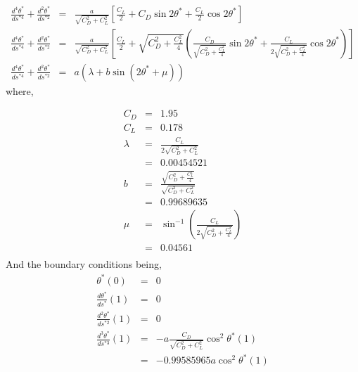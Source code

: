 \documentclass[a3paper,12pt]{report}
\begin{document}
\begin{eqnarray}
		\frac{d^4\theta^*}{ds^{*4}}+\frac{d^2\theta^*}{ds^{*2}} &=& \frac{a}{\sqrt{C_D^2+C_L^2}}\left[\frac{C_L}{2}+ C_D\sin2\theta^*+ \frac{C_L}{2}\cos2\theta^*\right]\\
		\frac{d^4\theta^*}{ds^{*4}}+\frac{d^2\theta^*}{ds^{*2}} &=& \frac{a}{\sqrt{C_D^2+C_L^2}}\left[\frac{C_L}{2}+ \sqrt{C_D^2 + \frac{C_L^2}{4}}\left(\frac{C_D}{\sqrt{C_D^2 + \frac{C_L^2}{4}}}\sin2\theta^*+ \frac{C_L}{2\sqrt{C_D^2 + \frac{C_L^2}{4}}}\cos2\theta^*\right)\right]\\
		\frac{d^4\theta^*}{ds^{*4}}+\frac{d^2\theta^*}{ds^{*2}} &=& a\left(\lambda+ b\sin(2\theta^* + \mu)\right)
	\end{eqnarray}
where,\\
\raggedright
\begin{eqnarray*}
C_D &=& 1.95\\
C_L &=& 0.178\\
\lambda &=& \frac{C_L}{2\sqrt{C_D^2+C_L^2}}\\
 &=& 0.00454521\\
b &=& \frac{\sqrt{C_D^2 + \frac{C_L^2}{4}}}{\sqrt{C_D^2+C_L^2}}\\
 &=& 0.99689635\\
\mu &=& \sin^{-1}\left(\frac{C_L}{2\sqrt{C_D^2 + \frac{C_L^2}{4}}}\right)\\
 &=& 0.04561\\
\end{eqnarray*}
And the boundary conditions being,
\begin{eqnarray}
\theta^*(0)&=&0\\ 
\frac{d\theta^*}{ds^*}(1) &=& 0\\
\frac{d^2\theta^*}{ds^{*2}}(1) &=& 0\\
\frac{d^3\theta^*}{ds^{*3}}(1) &=& -a \frac{C_D}{\sqrt{C_D^2+C_L^2}}\cos^2\theta^*(1) \\
&=& -0.99585965a\cos^2\theta^*(1)
\end{eqnarray}
\end{document}
